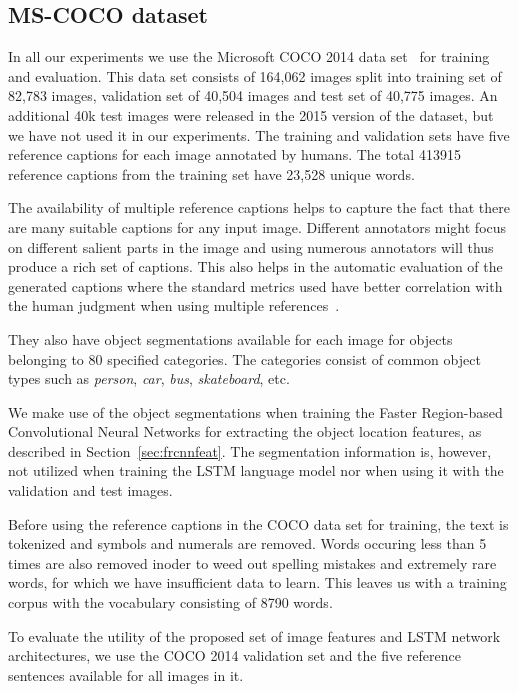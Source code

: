 \subsection{MS-COCO dataset}
In all our experiments we use the Microsoft COCO 2014 data set~\cite{Lin2014}
for training and evaluation.
This data set consists of 164,062 images split into training set of 82,783
images, validation set of 40,504 images and test set of 40,775 images. 
An additional 40k test images were released in the 2015 version of the dataset,
but we have not used it in our experiments.
The training and validation sets have five reference captions for each image
annotated by humans. 
The total 413915 reference captions from the training set have 23,528 unique
words.

The availability of multiple reference captions helps to capture the fact that
there are many suitable captions for any input image.
Different annotators might focus on different salient parts in the image and
using numerous annotators will thus produce a rich set of captions.
This also helps in the automatic evaluation of the generated captions where the
standard metrics used have better correlation with the human judgment when using
multiple references~\cite{Vedantam_2015_CVPR}.

They also have object segmentations available for each image for objects
belonging to 80 specified categories.
The categories consist of common object types such as \emph{person}, \emph{car},
\emph{bus}, \emph{skateboard}, etc.

We make use of the object segmentations when training the Faster Region-based
Convolutional Neural Networks for extracting the object location features, as
described in Section~\ref{sec:frcnnfeat}.
The segmentation information is, however, not utilized when training the LSTM
language model nor when using it with the validation and test images.

Before using the reference captions in the COCO data set for training, the text
is tokenized and symbols and numerals are removed.
Words occuring less than 5 times are also removed inoder to weed out 
spelling mistakes and extremely rare words, for which we have insufficient data
to learn.
This leaves us with a training corpus with the vocabulary consisting of 8790 words. 

To evaluate the utility of the proposed set of image features and LSTM network
architectures, we use the COCO 2014 validation set and the five reference
sentences available for all images in it.

